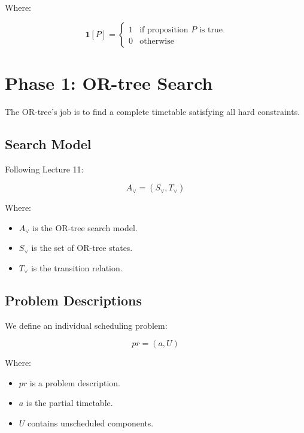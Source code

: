 \documentclass[11pt,letterpaper]{article}
\begin{document}
Where:

\begin{equation}
\mathbf{1}[P]=
\begin{cases}
1 & \text{if proposition }P\text{ is true}\\
0 & \text{otherwise}
\end{cases}
\end{equation}

\section{Phase 1: OR-tree Search}

The OR-tree's job is to find a complete
timetable satisfying all hard constraints.

\subsection{Search Model}

Following Lecture 11:

\begin{equation}
\boxed{
A_{\lor}=(S_{\lor},T_{\lor})
}
\end{equation}

Where:

\begin{itemize}
    \item $A_{\lor}$ is the OR-tree search model.
    \item $S_{\lor}$ is the set of OR-tree states.
    \item $T_{\lor}$ is the transition relation.
\end{itemize}

\subsection{Problem Descriptions}

We define an individual scheduling problem:

\begin{equation}
\boxed{
pr=(a,U)
}
\end{equation}

Where:

\begin{itemize}
    \item $pr$ is a problem description.
    \item $a$ is the partial timetable.
    \item $U$ contains unscheduled components.
\end{itemize}
\end{document}
